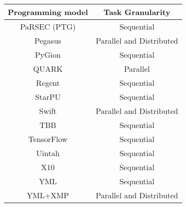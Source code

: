 \begin{tabular}{cc}
\hline
Programming model & Task Granularity \\
\hline
PaRSEC (PTG) & Sequential\\
Pegasus & Parallel and Distributed\\
PyGion & Sequential\\
QUARK & Parallel\\
Regent & Sequential\\
StarPU & Sequential\\
Swift & Parallel and Distributed\\
TBB & Sequential\\
TensorFlow & Sequential\\
Uintah & Sequential\\
X10 & Sequential\\
YML & Sequential\\
YML+XMP & Parallel and Distributed\\
\hline
\end{tabular}
